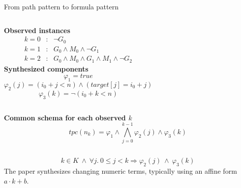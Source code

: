 \documentclass[english,aspectratio=169,t]{beamer}
\begin{document}
\begin{frame}{From path pattern to formula pattern}
  \begin{columns}[T,onlytextwidth]
      \textbf{Observed instances}\\[-0.15em]
      {\scriptsize
      \[
      \begin{array}{rcl}
      k=0 &:& \neg G_0\\[0.25em]
      k=1 &:& G_0\land M_0\land\neg G_1\\[0.25em]
      k=2 &:& G_0\land M_0\land G_1\land M_1\land\neg G_2
      \end{array}
      \]
      }
      \textbf{Synthesized components}\\[-0.25em]
      {\small
      \[
        \varphi_1=true
      \]
      \[
        \varphi_2(j)=(i_0+j<n)\land(target[j]=i_0+j)
      \]
      \[
        \varphi_3(k)=\neg(i_0+k<n)
      \]
      }
  \end{columns}

  \vspace{-0.2em}
  \textbf{Common schema for each observed $k$}\\[-0.2em]
  {\small
  \[
  tpc(n_k)=\varphi_1\land
  \bigwedge_{j=0}^{k-1}\varphi_2(j)
  \land \varphi_3(k)
  \]
  }

  \vspace{-0.45em}
  \begin{columns}[T,onlytextwidth]
      \centering
      {\small
      \[
        k\in K\ \land\
        \forall j.\ 0\le j<k\Rightarrow\varphi_2(j)
        \ \land\ \varphi_3(k)
      \]
      }
      \vspace{-0.55em}
      {\scriptsize The paper synthesizes changing numeric terms, typically using an affine form $a\cdot k+b$.}
  \end{columns}
\end{frame}
\end{document}
